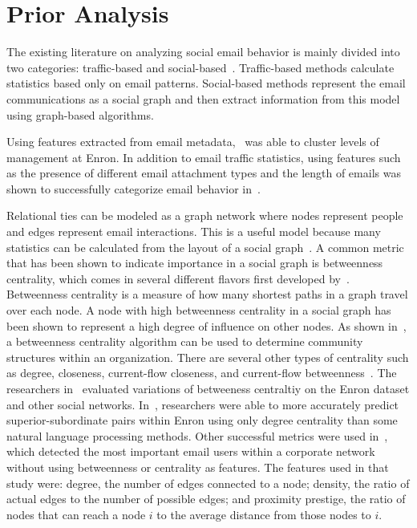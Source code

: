 \documentclass[12pt]{report}
\begin{document}
\section{Prior Analysis}
The existing literature on analyzing social email behavior is mainly divided into two categories: traffic-based and social-based~\cite{tang_email_2013}.
Traffic-based methods calculate statistics based only on email patterns.
Social-based methods represent the email communications as a social graph and then extract information from this model using graph-based algorithms.

Using features extracted from email metadata,~\cite{yelupula_social_2008} was able to cluster levels of management at Enron.
In addition to email traffic statistics, using features such as the presence of different email attachment types and the length of emails was shown to successfully categorize email behavior in~\cite{martin_analyzing_2005}.

Relational ties can be modeled as a graph network where nodes represent people and edges represent email interactions.
This is a useful model because many statistics can be calculated from the layout of a social graph~\cite{wasserman_social_1994}.
A common metric that has been shown to indicate importance in a social graph is betweenness centrality, which comes in several different flavors first developed by~\cite{freeman_set_1977}.
Betweenness centrality is a measure of how many shortest paths in a graph travel over each node.
A node with high betweenness centrality in a social graph has been shown to represent a high degree of influence on other nodes.
As shown in~\cite{tyler_email_2003}, a betweenness centrality algorithm can be used to determine community structures within an organization.
There are several other types of centrality such as degree, closeness, current-flow closeness, and current-flow betweenness~\cite{balinsky2011rapid}.
The researchers in~\cite{avrachenkov2013alpha} evaluated variations of betweeness centraltiy on the Enron dataset and other social networks.
In~\cite{agarwal_comprehensive_2012}, researchers were able to more accurately predict superior-subordinate pairs within Enron using only degree centrality than some natural language processing methods.
Other successful metrics were used in~\cite{wilson_discovery_2009}, which detected the most important email users within a corporate network without using betweenness or centrality as features.
The features used in that study were: degree, the number of edges connected to a node; density, the ratio of actual edges to the number of possible edges; and proximity prestige, the ratio of nodes that can reach a node $i$ to the average distance from those nodes to $i$.
\end{document}
